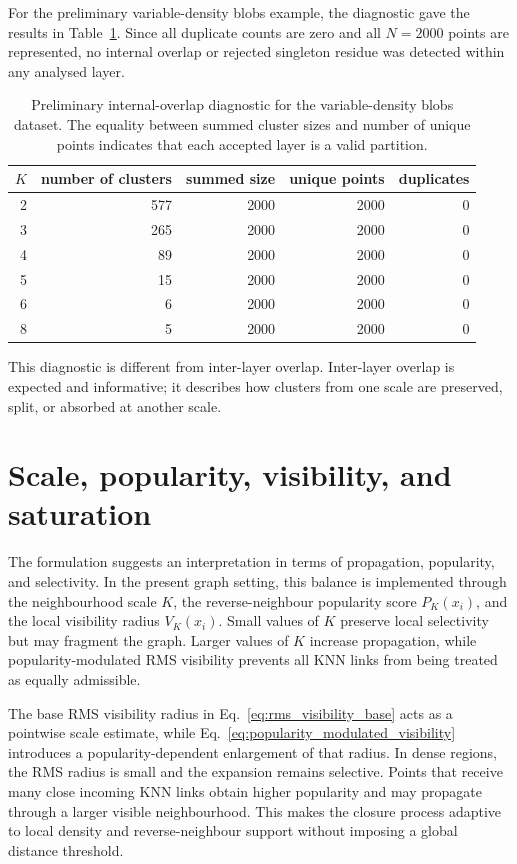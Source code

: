 \documentclass[pdflatex,sn-mathphys-num]{sn-jnl}
\begin{document}
For the preliminary variable-density blobs example, the diagnostic gave the results in Table~\ref{tab:partition_diagnostic}. Since all duplicate counts are zero and all $N=2000$ points are represented, no internal overlap or rejected singleton residue was detected within any analysed layer.

\begin{table}[t]
\caption{Preliminary internal-overlap diagnostic for the variable-density blobs dataset. The equality between summed cluster sizes and number of unique points indicates that each accepted layer is a valid partition.}\label{tab:partition_diagnostic}
\centering
\begin{tabular}{rrrrr}
\toprule
$K$ & number of clusters & summed size & unique points & duplicates\\
\midrule
2 & 577 & 2000 & 2000 & 0\\
3 & 265 & 2000 & 2000 & 0\\
4 & 89  & 2000 & 2000 & 0\\
5 & 15  & 2000 & 2000 & 0\\
6 & 6   & 2000 & 2000 & 0\\
8 & 5   & 2000 & 2000 & 0\\
\bottomrule
\end{tabular}
\end{table}

This diagnostic is different from inter-layer overlap. Inter-layer overlap is expected and informative; it describes how clusters from one scale are preserved, split, or absorbed at another scale.

\section{Scale, popularity, visibility, and saturation}\label{sec:scale}

The formulation suggests an interpretation in terms of propagation, popularity, and selectivity. In the present graph setting, this balance is implemented through the neighbourhood scale $K$, the reverse-neighbour popularity score $P_K(x_i)$, and the local visibility radius $V_K(x_i)$. Small values of $K$ preserve local selectivity but may fragment the graph. Larger values of $K$ increase propagation, while popularity-modulated RMS visibility prevents all KNN links from being treated as equally admissible.

The base RMS visibility radius in Eq.~\eqref{eq:rms_visibility_base} acts as a pointwise scale estimate, while Eq.~\eqref{eq:popularity_modulated_visibility} introduces a popularity-dependent enlargement of that radius. In dense regions, the RMS radius is small and the expansion remains selective. Points that receive many close incoming KNN links obtain higher popularity and may propagate through a larger visible neighbourhood. This makes the closure process adaptive to local density and reverse-neighbour support without imposing a global distance threshold.
\end{document}
